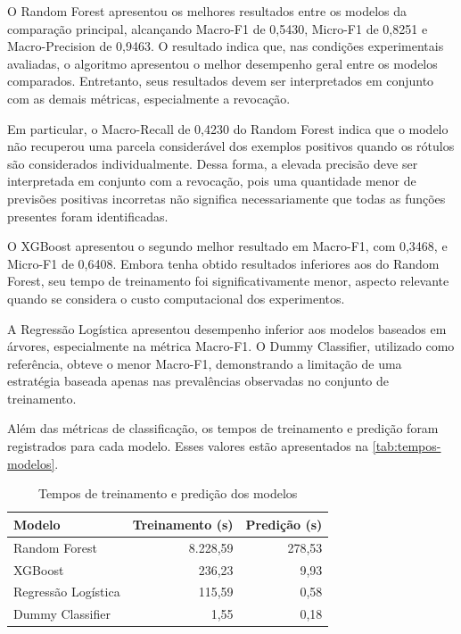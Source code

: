 O Random Forest apresentou os melhores resultados entre os modelos da comparação principal, alcançando Macro-F1 de 0,5430, Micro-F1 de 0,8251 e Macro-Precision de 0,9463. O resultado indica que, nas condições experimentais avaliadas, o algoritmo apresentou o melhor desempenho geral entre os modelos comparados. Entretanto, seus resultados devem ser interpretados em conjunto com as demais métricas, especialmente a revocação.

Em particular, o Macro-Recall de 0,4230 do Random Forest indica que o modelo não recuperou uma parcela considerável dos exemplos positivos quando os rótulos são considerados individualmente. Dessa forma, a elevada precisão deve ser interpretada em conjunto com a revocação, pois uma quantidade menor de previsões positivas incorretas não significa necessariamente que todas as funções presentes foram identificadas.

O XGBoost apresentou o segundo melhor resultado em Macro-F1, com 0,3468, e Micro-F1 de 0,6408. Embora tenha obtido resultados inferiores aos do Random Forest, seu tempo de treinamento foi significativamente menor, aspecto relevante quando se considera o custo computacional dos experimentos.

A Regressão Logística apresentou desempenho inferior aos modelos baseados em árvores, especialmente na métrica Macro-F1. O Dummy Classifier, utilizado como referência, obteve o menor Macro-F1, demonstrando a limitação de uma estratégia baseada apenas nas prevalências observadas no conjunto de treinamento.

Além das métricas de classificação, os tempos de treinamento e predição foram registrados para cada modelo. Esses valores estão apresentados na \autoref{tab:tempos-modelos}.

\begin{table}[htb]
    \centering
    \ABNTEXfontereduzida
    \caption{Tempos de treinamento e predição dos modelos}
    \label{tab:tempos-modelos}
    \begin{tabular}{lrr}
        \toprule
        \textbf{Modelo} & \textbf{Treinamento (s)} & \textbf{Predição (s)} \\
        \midrule
        Random Forest & 8.228,59 & 278,53 \\
        XGBoost & 236,23 & 9,93 \\
        Regressão Logística & 115,59 & 0,58 \\
        Dummy Classifier & 1,55 & 0,18 \\
        \bottomrule
    \end{tabular}
\end{table}


